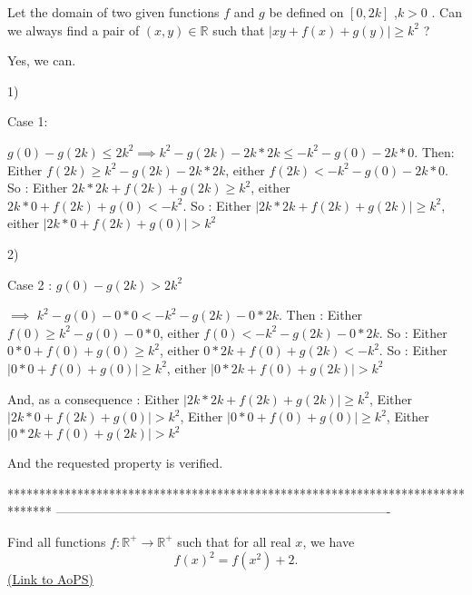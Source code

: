 \begin{mysolution}
	\begin{tcolorbox}Let the domain of two given functions $f$ and $g$ be defined on $[0,2k]$ ,$k>0$ . Can we always find a pair of $(x,y)\in\mathbb{R}$ such that $|xy+f(x)+g(y)|\geq k^{2}$ ?\end{tcolorbox}

Yes, we can.

1) \begin{underlined}Case 1:\end{underlined} $g(0)-g(2k)\leq 2k^{2} \implies k^{2}-g(2k)-2k*2k\leq-k^{2}-g(0)-2k*0$. Then:
Either $f(2k)\geq k^{2}-g(2k)-2k*2k$, either $f(2k)<-k^{2}-g(0)-2k*0$. So :
Either $2k*2k+f(2k)+g(2k)\geq k^{2}$, either $2k*0+f(2k)+g(0)<-k^{2}$. So :
Either  $|2k*2k+f(2k)+g(2k)|\geq k^{2}$, either $|2k*0+f(2k)+g(0)|> k^{2}$

2) \begin{underlined}Case 2 : $g(0)-g(2k)> 2k^{2}$\end{underlined} $\implies$ $k^{2}-g(0)-0*0<-k^{2}-g(2k)-0*2k$. Then :
Either $f(0)\geq k^{2}-g(0)-0*0$, either $f(0)<-k^{2}-g(2k)-0*2k$. So :
Either $0*0+f(0)+g(0)\geq k^{2}$, either $0*2k+f(0)+g(2k)<-k^{2}$. So :
Either  $|0*0+f(0)+g(0)|\geq k^{2}$, either $|0*2k+f(0)+g(2k)|> k^{2}$

And, as a consequence :
Either  $|2k*2k+f(2k)+g(2k)|\geq k^{2}$,
Either $|2k*0+f(2k)+g(0)|> k^{2}$,
Either  $|0*0+f(0)+g(0)|\geq k^{2}$,
Either $|0*2k+f(0)+g(2k)|> k^{2}$

And the requested property is verified.
\end{mysolution}



*******************************************************************************
-------------------------------------------------------------------------------

\begin{problem}
	Find all functions $f: \mathbb R^{+}\to \mathbb R^{+}$ such that for all real $x$, we have
\[f(x)^{2}=f(x^{2})+2.\]
	\flushright \href{https://artofproblemsolving.com/community/c6h155157}{(Link to AoPS)}
\end{problem}



